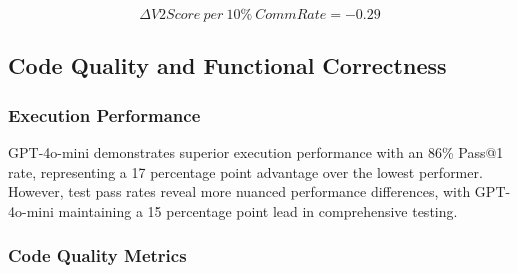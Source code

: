 \documentclass[conference]{IEEEtran}
\begin{document}
\begin{equation}
    \mathit{\Delta V2Score~per~10\%~CommRate} = -0.29
\end{equation}

\subsection{Code Quality and Functional Correctness}

\subsubsection{Execution Performance}

\begin{table}[ht]
\centering
\small
\caption{Functional Correctness and Test Performance}
\label{tab:functional_correctness}
\end{table}

GPT-4o-mini demonstrates superior execution performance with an 86\% Pass@1 rate, representing a 17 percentage point advantage over the lowest performer. However, test pass rates reveal more nuanced performance differences, with GPT-4o-mini maintaining a 15 percentage point lead in comprehensive testing.

\subsubsection{Code Quality Metrics}

\begin{table}[ht]
\centering
\small
\caption{Code Quality and Trustworthiness Metrics}
\label{tab:code_quality}
\end{table}
\end{document}
